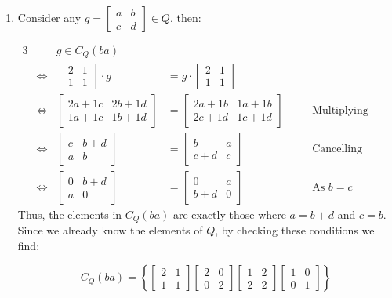 \documentclass[a4paper, 11pt]{article}
\def\set#1{\left\{ #1 \right\}}
\begin{document}
\begin{enumerate}[label=(\alph*)]
	\item 
	Consider any $g=\begin{bmatrix}
		a & b\\
		c & d
	\end{bmatrix}\in Q$, then: 
	
	\begin{alignat*}{3}
		&& g\in C_Q(ba) \\
		&\iff&\begin{bmatrix}
			2 & 1 \\
			1 & 1 
		\end{bmatrix}\cdot g 
		&= g\cdot\begin{bmatrix}
			2 & 1 \\
			1 & 1 
		\end{bmatrix}\\
		&\iff & 
		\begin{bmatrix}
			2a + 1c & 2b + 1d \\
			1a + 1c & 1b + 1d 
		\end{bmatrix} &= 
		\begin{bmatrix}
			2a + 1b & 1a+1b \\ 
			2c + 1d & 1c+1d 
		\end{bmatrix} & \quad & \text{Multiplying Matrices}\\
		&\iff & 
		\begin{bmatrix}
			c & b + d \\
			a & b 
		\end{bmatrix} &= 
		\begin{bmatrix}
			b & a \\ 
			c + d & c
		\end{bmatrix} &\quad & \text{Cancelling}\\
		&\iff & 
		\begin{bmatrix}
			0 & b + d \\
			a & 0 
		\end{bmatrix} &= 
		\begin{bmatrix}
			0 & a \\ 
			b + d & 0
		\end{bmatrix} & \quad & \text{As $b=c$}
	\end{alignat*}
	Thus, the elements in $C_Q(ba)$ are exactly those where $a=b+d$ and $c=b$. Since we already know the elements of $Q$, by checking these conditions we find: 

	\[
		C_Q(ba) = \set{
			\begin{bmatrix}
				2 & 1 \\
				1 & 1
			\end{bmatrix}			
			\begin{bmatrix}
				2 & 0 \\
				0 & 2
			\end{bmatrix}
			\begin{bmatrix}
				1 & 2 \\
				2 & 2
			\end{bmatrix}
			\begin{bmatrix}
				1 & 0 \\
				0 & 1
			\end{bmatrix}
		}
	\]

\end{enumerate}
\end{document}
